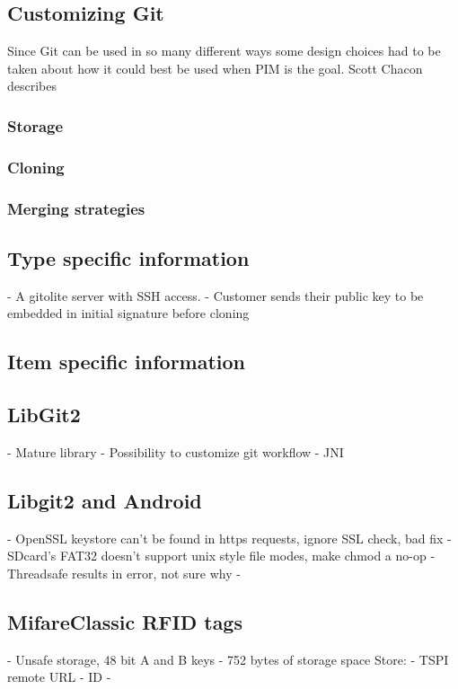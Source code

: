 \documentclass[12pt,a4paper]{article}
\begin{document}
\subsection{Customizing Git}
Since Git can be used in so many different ways some design choices had to be taken about how it could best be used when PIM is the goal. Scott Chacon \citep{progit} describes 
\subsubsection{Storage}
\label{storage}

\subsubsection{Cloning}

\subsubsection{Merging strategies}

\subsection{Type specific information}
- A gitolite server with SSH access. 
- Customer sends their public key to be embedded in initial signature before cloning

\subsection{Item specific information}

\subsection{LibGit2}
- Mature library
- Possibility to customize git workflow
- JNI 
\subsection{Libgit2 and Android}
- OpenSSL keystore can't be found in https requests, ignore SSL check, bad fix
- SDcard's FAT32 doesn't support unix style file modes, make chmod a no-op
- Threadsafe results in error, not sure why
- 
\subsection{MifareClassic RFID tags}

- Unsafe storage, 48 bit A and B keys
- 752 bytes of storage space
Store:
- TSPI remote URL
- ID
- 
\end{document}

